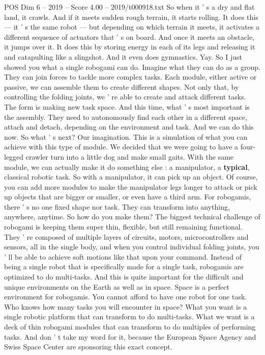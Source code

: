 \begin{textsample}{POS Dim 6 – 2019 – Score 4.00 – 2019/t000918.txt}
So when it ' s a dry and flat land, it crawls.
And if it meets sudden rough terrain, it starts rolling.
It does this — it ' s the same robot — but depending on which terrain it meets, it activates a different sequence of actuators that ' s on board.
And once it meets an obstacle, it jumps over it.
It does this by storing energy in each of its legs and releasing it and catapulting like a slingshot.
And it even does gymnastics.
Yay.
So I just showed you what a single robogami can do.
Imagine what they can do as a group.
They can join forces to tackle more complex tasks.
Each module, either active or passive, we can assemble them to create different shapes.
Not only that, by controlling the folding joints, we ' re able to create and attack different tasks.
The form is making new task space.
And this time, what ' s most important is the assembly.
They need to autonomously find each other in a different space, attach and detach, depending on the environment and task.
And we can do this now.
So what ' s next?
Our imagination.
This is a simulation of what you can achieve with this type of module.
We decided that we were going to have a four-legged crawler turn into a little dog and make small gaits.
With the same module, we can actually make it do something else : a manipulator, a \textbf{typical}, classical robotic task.
So with a manipulator, it can pick up an object.
Of course, you can add more modules to make the manipulator legs longer to attack or pick up objects that are bigger or smaller, or even have a third arm.
For robogamis, there ' s no one fixed shape nor task.
They can transform into anything, anywhere, anytime.
So how do you make them?
The biggest technical challenge of robogami is keeping them super thin, flexible, but still remaining functional.
They ' re composed of multiple layers of circuits, motors, microcontrollers and sensors, all in the single body, and when you control individual folding joints, you ' ll be able to achieve soft motions like that upon your command.
Instead of being a single robot that is specifically made for a single task, robogamis are optimized to do multi-tasks.
And this is quite important for the difficult and unique environments on the Earth as well as in space.
Space is a perfect environment for robogamis.
You cannot afford to have one robot for one task.
Who knows how many tasks you will encounter in space?
What you want is a single robotic platform that can transform to do multi-tasks.
What we want is a deck of thin robogami modules that can transform to do multiples of performing tasks.
And don ' t take my word for it, because the European Space Agency and Swiss Space Center are sponsoring this exact concept.

\end{textsample}
